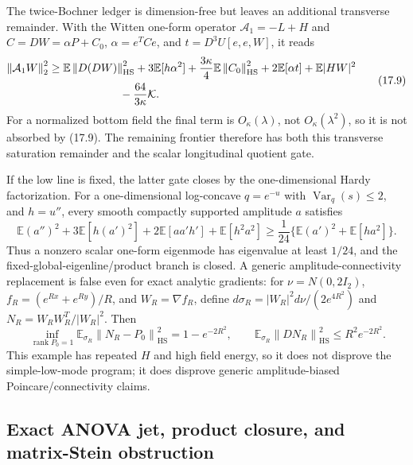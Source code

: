 \documentclass[11pt]{article}
\theoremstyle{definition}
\theoremstyle{remark}
\newcommand{\E}{\mathbb E}
\newcommand{\Var}{\operatorname{Var}}
\newcommand{\HS}{\mathrm{HS}}
\newcommand{\1}{\mathbf 1}
\newcommand{\norm}[1]{\left\lVert #1\right\rVert}
\begin{document}
The twice-Bochner ledger is dimension-free but leaves an additional
transverse remainder.  With the Witten one-form operator
\(\mathcal A_1=-L+H\) and \(C=DW=\alpha P+C_0\),
\(\alpha=e^TCe\), and \(t=D^3U[e,e,W]\), it reads
\[
 \begin{aligned}
 \norm{\mathcal A_1W}_2^2\ge{}&
 \E\norm{D(DW)}_{\HS}^2+3\E[h\alpha^2]
 +\frac{3\kappa}{4}\E\norm{C_0}_{\HS}^2+2\E[\alpha t]+\E|HW|^2\\
 &\hspace{18mm}-\frac{64}{3\kappa}\mathcal K .
 \end{aligned}                                         \tag{17.9}
\]
For a normalized bottom field the final term is \(O_\kappa(\lambda)\), not
\(O_\kappa(\lambda^2)\), so it is not absorbed by (17.9).  The remaining
frontier therefore has both this transverse saturation remainder and the
scalar longitudinal quotient gate.

If the low line is fixed, the latter gate closes by the one-dimensional
Hardy factorization.  For a one-dimensional log-concave \(q=e^{-u}\) with
\(\Var_q(s)\le2\), and \(h=u''\), every smooth compactly supported amplitude
\(a\) satisfies
\[
 \E(a'')^2+3\E[h(a')^2]+2\E[aa'h']+\E[h^2a^2]
 \ge \frac1{24}\{\E(a')^2+\E[ha^2]\}.                \tag{17.10}
\]
Thus a nonzero scalar one-form eigenmode has eigenvalue at least \(1/24\),
and the fixed-global-eigenline/product branch is closed.  A generic
amplitude-connectivity replacement is false even for exact analytic
gradients: for \(\nu=N(0,2I_2)\),
\(f_R=(e^{Rx}+e^{Ry})/R\), and \(W_R=\nabla f_R\), define
\(d\sigma_R=|W_R|^2d\nu/(2e^{4R^2})\) and
\(N_R=W_RW_R^T/|W_R|^2\).  Then
\[
 \inf_{\operatorname{rank} P_0=1}\E_{\sigma_R}\norm{N_R-P_0}_{\HS}^2
 =1-e^{-2R^2},\qquad
 \E_{\sigma_R}\norm{DN_R}_{\HS}^2\le R^2e^{-2R^2}.  \tag{17.11}
\]
This example has repeated \(H\) and high field energy, so it does not
disprove the simple-low-mode program; it does disprove generic
amplitude-biased Poincare/connectivity claims.

\subsection{Exact ANOVA jet, product closure, and matrix-Stein obstruction}
\end{document}
